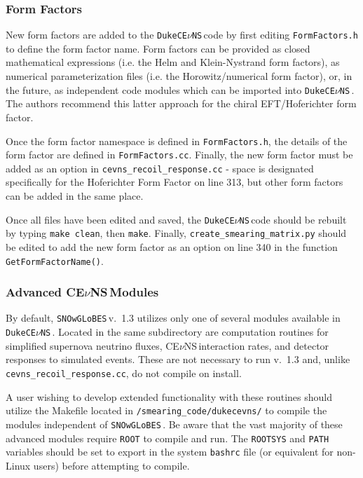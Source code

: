 \documentclass{article}
\newcommand{\cev}{CE$\nu$NS\,}
\newcommand{\snow}{\texttt{SNOwGLoBES}\,}
\newcommand{\dukecev}{\texttt{DukeCE$\nu$NS}\,}
\begin{document}
\subsubsection{Form Factors}

New form factors are added to the \dukecev code by first editing \texttt{FormFactors.h} to define the form factor name. Form factors can be provided as closed mathematical expressions (i.e. the Helm and Klein-Nystrand form factors), as numerical parameterization files (i.e. the Horowitz/numerical form factor), or, in the future, as independent code modules which can be imported into \dukecev. The authors recommend this latter approach for the chiral EFT/Hoferichter form factor.

Once the form factor namespace is defined in \texttt{FormFactors.h}, the details of the form factor are defined in \texttt{FormFactors.cc}. Finally, the new form factor must be added as an option in \texttt{cevns\_recoil\_response.cc} - space is designated specifically for the Hoferichter Form Factor on line 313, but other form factors can be added in the same place.

Once all files have been edited and saved, the \dukecev code should be rebuilt by typing \texttt{make clean}, then \texttt{make}. Finally, \texttt{create\_smearing\_matrix.py} should be edited to add the new form factor as an option on line 340 in the function \texttt{GetFormFactorName()}.


\subsubsection{Advanced \cev Modules}

By default, \snow v.~1.3 utilizes only one of several modules available in \dukecev. Located in the same subdirectory are computation routines for simplified supernova neutrino fluxes, \cev interaction rates, and detector responses to simulated events. These are not necessary to run v.~1.3 and, unlike \texttt{cevns\_recoil\_response.cc}, do not compile on install.

A user wishing to develop extended functionality with these routines should utilize the Makefile located in \texttt{/smearing\_code/dukecevns/} to compile the modules independent of \snow. Be aware that the vast majority of these advanced modules require \texttt{ROOT} to compile and run. The \texttt{ROOTSYS} and \texttt{PATH} variables should be set to export in the system \texttt{bashrc} file (or equivalent for non-Linux users) before attempting to compile.
\end{document}
